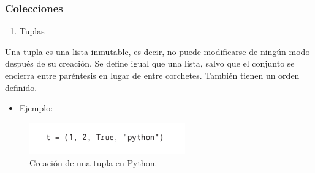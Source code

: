 \begin{frame}[fragile]
  \frametitle{Colecciones}

  \begin{enumerate}[2.]
    \item Tuplas    
  \end{enumerate}


  Una tupla es una lista inmutable, es decir, no puede modificarse de ning\'un modo despu\'es de su creaci\'on. Se define igual que una lista, salvo que el conjunto se encierra entre par\'entesis en lugar de entre corchetes. Tambi\'en tienen un orden definido.

  \begin{itemize}
    \item Ejemplo:
  \end{itemize}

  \begin{figure}
    \includegraphics[width=0.6\textwidth]{Imagenes/Tuplas.jpg}
    \caption{\label{fig:Ejemplo2}Creaci\'on de una tupla en Python.}
  \end{figure}  
 
 
\end{frame}
